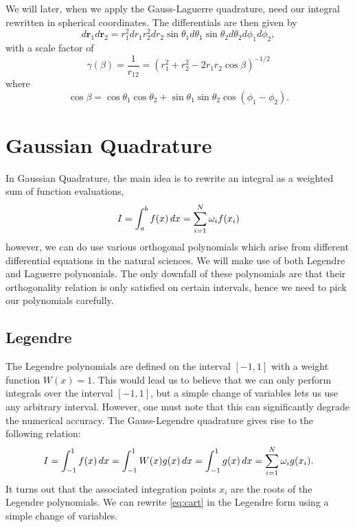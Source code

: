\documentclass[intlimits]{amsart}
\renewcommand{\v}[1]{\mathbf{#1}}
\begin{document}
We will later, when we apply the Gauss-Laguerre quadrature, need our integral
rewritten in spherical coordinates. The differentials are then given by
\begin{equation}
  \label{eq:diff}
  d\v{r}_1d\v{r}_2 = r_1^2dr_1r_2^2dr_2\sin\theta_1d\theta_1\sin\theta_2d\theta_2d\phi_1d\phi_2,
\end{equation}
with a scale factor of
\begin{equation}
  \label{eq:scale}
  \gamma(\beta) = \frac{1}{r_{12}} = \left( r_1^2 + r_2^2 - 2r_1r_2\cos\beta \right)^{-1/2}
\end{equation}
where $$\cos\beta = \cos\theta_1\cos\theta_2 +
\sin\theta_1\sin\theta_2\cos(\phi_1 - \phi_2).$$

\section{Gaussian Quadrature}
\label{sec:gaussian_quadrature}

In Gaussian Quadrature, the main idea is to rewrite an integral as a weighted
sum of function evaluations,
\begin{equation}
  \notag
  I = \int_a^b f(x) \, dx = \sum_{i=1}^{N} \omega_i f(x_i)
\end{equation}
however, we can do use various orthogonal polynomials which arise from
different differential equations in the natural sciences. We will make use of
both Legendre and Laguerre polynomials. The only downfall of these polynomials
are that their orthogonality relation is only satisfied on certain intervals,
hence we need to pick our polynomials carefully.

\subsection{Legendre}
\label{sub:legendre_polynomials}

The Legendre polynomials are defined on the interval $[-1, 1]$ with a weight
function $W(x) = 1$.  This would lead us to believe that we can only perform
integrals over the interval $[-1, 1]$, but a simple change of variables lets us
use any arbitrary interval. However, one must note that this can significantly
degrade the numerical accuracy. The Gauss-Legendre quadrature gives rise to the following
relation:
\begin{equation}
  \notag
  I = \int_{-1}^{1} f(x) \, dx = \int_{-1}^{1}W(x)g(x)\, dx = \int_{-1}^{1}g(x)
  \, dx = \sum^{N}_{i=1} \omega_ig(x_i).
\end{equation}
It turns out that the associated integration points $x_i$ are the roots of the
Legendre polynomials. We can rewrite \cref{eq:cart} in the Legendre form using a simple change of variables.
\end{document}
